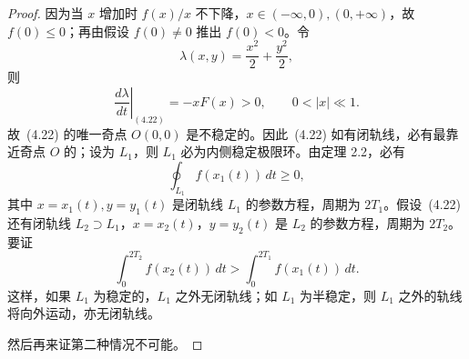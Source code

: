 \begin{proof}
因为当 $x$ 增加时 $f(x)/x$ 不下降，$x\in(-\infty,0),(0,+\infty)$，故 $f(0)\leq0$；再由假设 $f(0)\ne0$ 推出 $f(0)<0$。令
\[
\lambda(x,y)=\dfrac{x^2}{2}+\dfrac{y^2}{2},
\]
则
\[
\left.\dfrac{d\lambda}{dt}\right|_{(4.22)}=-xF(x)>0,\qquad 0<|x|\ll1.
\]
故~(4.22) 的唯一奇点 $O(0,0)$ 是不稳定的。因此~(4.22) 如有闭轨线，必有最靠近奇点 $O$ 的；设为 $L_1$，则 $L_1$ 必为内侧稳定极限环。由定理 2.2，必有
\[
\oint_{L_1}f(x_1(t))\,dt\geq0,
\]
其中 $x=x_1(t),y=y_1(t)$ 是闭轨线 $L_1$ 的参数方程，周期为 $2T_1$。假设~(4.22) 还有闭轨线 $L_2\supset L_1$，$x=x_2(t)$，$y=y_2(t)$ 是 $L_2$ 的参数方程，周期为 $2T_2$。要证
\[
\int_0^{2T_2}f(x_2(t))\,dt>
\int_0^{2T_1}f(x_1(t))\,dt. \tag{4.23}
\]
这样，如果 $L_1$ 为稳定的，$L_1$ 之外无闭轨线；如 $L_1$ 为半稳定，则 $L_1$ 之外的轨线将向外运动，亦无闭轨线。

然后再来证第二种情况不可能。


\end{proof}
